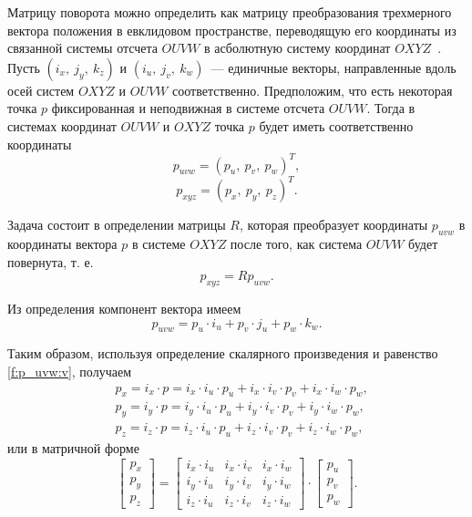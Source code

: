 \documentclass[oneside, final, 14pt]{extarticle}
\begin{document}
\par
Матрицу поворота можно определить как матрицу преобразования трехмерного вектора положения в евклидовом пространстве, переводящую его координаты из связанной системы отсчета \(OUVW\) в асболютную систему координат \(OXYZ\)~\cite{fu:rob_tech}.
Пусть \((i_x,\:j_y,\:k_z)\) и \((i_u,\:j_v,\:k_w)\)~--- единичные векторы, направленные вдоль осей систем \(OXYZ\) и \(OUVW\) соответственно.
Предположим, что есть некоторая точка \(p\) фиксированная и неподвижная в системе отсчета \(OUVW\).
Тогда в системах координат \(OUVW\) и \(OXYZ\) точка \(p\) будет иметь соответственно координаты~\cite{fu:rob_tech}
\begin{equation}\label{f:p_uvw:c}
  p_{uvw} = (p_u,\:p_v,\:p_w)^T
  ,
\end{equation}
\begin{equation}\label{f:p_xyz:c}
  p_{xyz} = (p_x,\:p_y,\:p_z)^T
  .
\end{equation}
\par
Задача состоит в определении матрицы \(R\), которая преобразует координаты \(p_{uvw}\) в координаты вектора \(p\) в системе \(OXYZ\) после того, как система \(OUVW\) будет повернута, т. е.
\begin{equation}\label{f:p_xyz:ouvw:sh}
  p_{xyz} = R p_{uvw}
  .
\end{equation}
\par
Из определения компонент вектора имеем 
\begin{equation}\label{f:p_uvw:v}
  p_{uvw} = p_u \cdot i_u + p_v \cdot j_u + p_w \cdot k_w
  .
\end{equation}
\par
Таким образом, используя определение скалярного произведения и равенство \ref{f:p_uvw:v}, получаем 
\begin{equation}\label{f:p_xyz:ouvw}
  \begin{aligned}
  & p_x = i_x \cdot p =  i_x \cdot i_u \cdot p_u + i_x \cdot i_v \cdot p_v + i_x \cdot i_w \cdot p_w,\\
  & p_y = i_y \cdot p =  i_y \cdot i_u \cdot p_u + i_y \cdot i_v \cdot p_v + i_y \cdot i_w \cdot p_w,\\
  & p_z = i_z \cdot p =  i_z \cdot i_u \cdot p_u + i_z \cdot i_v \cdot p_v + i_z \cdot i_w \cdot p_w,
  \end{aligned}
\end{equation}
или в матричной форме
\begin{equation}\label{f:p_xyz:ouvw:m}
  \begin{bmatrix}
  p_x\\
  p_y\\
  p_z
  \end{bmatrix}
  =
  \begin{bmatrix}
  i_x \cdot i_u & i_x \cdot i_v & i_x \cdot i_w\\
  i_y \cdot i_u & i_y \cdot i_v & i_y \cdot i_w\\
  i_z \cdot i_u & i_z \cdot i_v & i_z \cdot i_w
  \end{bmatrix}
  \cdot
\begin{bmatrix}
  p_u\\
  p_v\\
  p_w
  \end{bmatrix}
  .
\end{equation}
\end{document}
